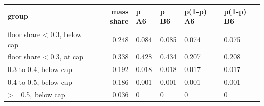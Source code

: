 \begingroup\small
\setlength{\tabcolsep}{3pt}
\renewcommand{\arraystretch}{1.04}
\begin{tabularx}{\linewidth}{XrXXXX}
\toprule
group & mass share & p A6 & p B6 & p(1-p) A6 & p(1-p) B6 \\
\midrule
floor share \textless{} 0.3, below cap & 0.248 & 0.084 & 0.085 & 0.074 & 0.075 \\
floor share \textless{} 0.3, at cap & 0.338 & 0.428 & 0.434 & 0.207 & 0.208 \\
0.3 to 0.4, below cap & 0.192 & 0.018 & 0.018 & 0.017 & 0.017 \\
0.4 to 0.5, below cap & 0.186 & 0.001 & 0.001 & 0.001 & 0.001 \\
\textgreater{}= 0.5, below cap & 0.036 & 0 & 0 & 0 & 0 \\
\bottomrule
\end{tabularx}
\endgroup

